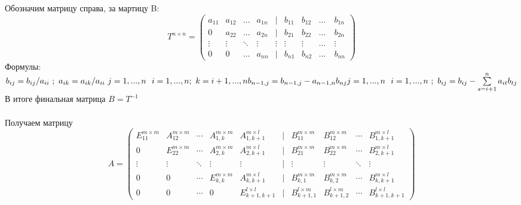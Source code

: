 \documentclass[a4paper,12pt]{article}
\begin{document}
Обозначим матрицу справа, за мартицу B:
$$T^{n\times n}=
   \begin{pmatrix}
     a_{11}& a_{12} &\ldots & a_{1n} & | & b_{11} & b_{12} & \ldots \ & b_{1n}\\
     0& a_{22} &\ldots & a_{2n} & | & b_{21} & b_{22} & \ldots \ & b_{2n}\\
     \vdots& \vdots &\ddots & \vdots &\vdots& \vdots &\vdots & \ldots & \vdots \\
     0& 0 &\ldots & a_{nn} & | & b_{n1} & b_{n2} & \ldots \ & b_{nn}
    \end{pmatrix}
$$
Формулы:\\
$b_{ij} = b_{ij}/a_{ii} \ ; \ a_{ik} = a_{ik}/a_{ii} \ j = 1,...,n \ \ i = 1,...,n; \ k = i+1,...,n\\
b_{n-1,j} = b_{n-1,j} - a_{n-1,n}b_{nj}\\
j = 1,...,n \ \ i = 1,...,n\ ; \ b_{ij} = b_{ij} - \sum\limits_{s = i+1}^n {a_{it}}{b_{tj}} $\\
В итоге финальная матрица $B = T^{-1}$\\\\
Получаем матрицу \begin{equation}
A=
  \begin{pmatrix} 
    E_{11}^{m \times m} & A_{12}^{m \times m} & \cdots & A_{1,k}^{m \times m} & A_{1,k+1}^{m \times l} & | & B_{11}^{m \times m} &  B_{12}^{m \times m} & \cdots & B_{1,k+1}^{m \times l}\\
    0 & E_{22}^{m \times m} & \cdots & A_{2,k}^{m \times m} & A_{2,k+1}^{m \times l} & | & B_{21}^{m \times m} &  B_{22}^{m \times m} & \cdots & B_{2,k+1}^{m \times l}\\
    \vdots & \vdots & \ddots & \vdots & \vdots & | & \vdots & \vdots & \ddots & \vdots\\ 
    0 & 0 & \cdots & E_{k,k}^{m \times m} & A_{k,k+1}^{m \times l} & | & B_{k,1}^{m \times m} &  B_{k,2}^{m \times m} & \cdots & B_{k,k+1}^{m \times l}\\
    0 & 0 & \cdots & 0 & E_{k+1,k+1}^{l \times l} & | & B_{k+1,1}^{l \times m} &  B_{k+1,2}^{l \times m} & \cdots & B_{k+1,k+1}^{l \times l} 
  \end{pmatrix}
\end{equation}
\end{document}
